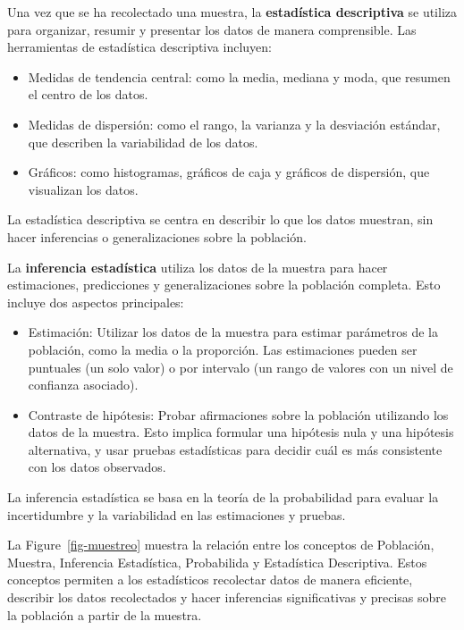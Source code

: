 \documentclass[
  letterpaper,
  DIV=11,
  numbers=noendperiod]{scrreprt}
\providecommand{\tightlist}{%
  \setlength{\itemsep}{0pt}\setlength{\parskip}{0pt}}\usepackage{longtable,booktabs,array}
\begin{document}
Una vez que se ha recolectado una muestra, la \textbf{estadística
descriptiva} se utiliza para organizar, resumir y presentar los datos de
manera comprensible. Las herramientas de estadística descriptiva
incluyen:

\begin{itemize}
\tightlist
\item
  Medidas de tendencia central: como la media, mediana y moda, que
  resumen el centro de los datos.
\item
  Medidas de dispersión: como el rango, la varianza y la desviación
  estándar, que describen la variabilidad de los datos.
\item
  Gráficos: como histogramas, gráficos de caja y gráficos de dispersión,
  que visualizan los datos.
\end{itemize}

La estadística descriptiva se centra en describir lo que los datos
muestran, sin hacer inferencias o generalizaciones sobre la población.

La \textbf{inferencia estadística} utiliza los datos de la muestra para
hacer estimaciones, predicciones y generalizaciones sobre la población
completa. Esto incluye dos aspectos principales:

\begin{itemize}
\tightlist
\item
  Estimación: Utilizar los datos de la muestra para estimar parámetros
  de la población, como la media o la proporción. Las estimaciones
  pueden ser puntuales (un solo valor) o por intervalo (un rango de
  valores con un nivel de confianza asociado).
\item
  Contraste de hipótesis: Probar afirmaciones sobre la población
  utilizando los datos de la muestra. Esto implica formular una
  hipótesis nula y una hipótesis alternativa, y usar pruebas
  estadísticas para decidir cuál es más consistente con los datos
  observados.
\end{itemize}

La inferencia estadística se basa en la teoría de la probabilidad para
evaluar la incertidumbre y la variabilidad en las estimaciones y
pruebas.

La Figure~\ref{fig-muestreo} muestra la relación entre los conceptos de
Población, Muestra, Inferencia Estadística, Probabilida y Estadística
Descriptiva. Estos conceptos permiten a los estadísticos recolectar
datos de manera eficiente, describir los datos recolectados y hacer
inferencias significativas y precisas sobre la población a partir de la
muestra.
\end{document}

